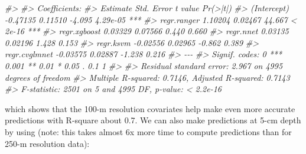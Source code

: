 \documentclass[
  graybox,natbib,nospthms]{svmono}
\newenvironment{Shaded}{\begin{snugshade}}{\end{snugshade}}
\newcommand{\CommentTok}[1]{\textcolor[rgb]{0.37,0.37,0.37}{\textit{#1}}}
\begin{document}
\begin{Shaded}
\begin{Highlighting}[]
\CommentTok{\#\textgreater{} }
\CommentTok{\#\textgreater{} Coefficients:}
\CommentTok{\#\textgreater{}               Estimate Std. Error t value Pr(\textgreater{}|t|)    }
\CommentTok{\#\textgreater{} (Intercept)   {-}0.47135    0.11510  {-}4.095 4.29e{-}05 ***}
\CommentTok{\#\textgreater{} regr.ranger    1.10204    0.02467  44.667  \textless{} 2e{-}16 ***}
\CommentTok{\#\textgreater{} regr.xgboost   0.03329    0.07566   0.440    0.660    }
\CommentTok{\#\textgreater{} regr.nnet      0.03135    0.02196   1.428    0.153    }
\CommentTok{\#\textgreater{} regr.ksvm     {-}0.02556    0.02965  {-}0.862    0.389    }
\CommentTok{\#\textgreater{} regr.cvglmnet {-}0.03575    0.02887  {-}1.238    0.216    }
\CommentTok{\#\textgreater{} {-}{-}{-}}
\CommentTok{\#\textgreater{} Signif. codes:  0 \textquotesingle{}***\textquotesingle{} 0.001 \textquotesingle{}**\textquotesingle{} 0.01 \textquotesingle{}*\textquotesingle{} 0.05 \textquotesingle{}.\textquotesingle{} 0.1 \textquotesingle{} \textquotesingle{} 1}
\CommentTok{\#\textgreater{} }
\CommentTok{\#\textgreater{} Residual standard error: 2.967 on 4995 degrees of freedom}
\CommentTok{\#\textgreater{} Multiple R{-}squared:  0.7146, Adjusted R{-}squared:  0.7143 }
\CommentTok{\#\textgreater{} F{-}statistic:  2501 on 5 and 4995 DF,  p{-}value: \textless{} 2.2e{-}16}
\end{Highlighting}
\end{Shaded}

which shows that the 100-m resolution covariates help make even more accurate
predictions with R-square about 0.7. We can also make predictions at 5-cm depth
by using (note: this takes almost 6x more time to compute predictions than for
250-m resolution data):
\end{document}
